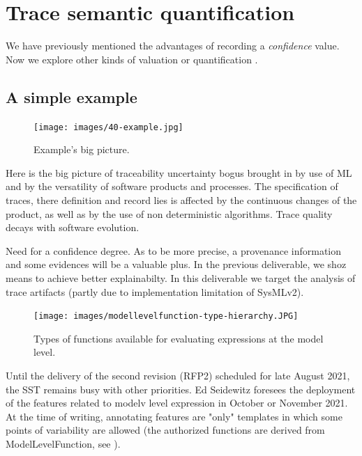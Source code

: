 \section{Trace semantic quantification}\label{sec:quantification}

We have previously mentioned the advantages of recording a \textit{confidence} value. Now we explore other kinds of valuation or quantification . 



\subsection{A simple example}\label{sec:example}
 
\begin{figure}[ht]     
	\centering
	\texttt{[image: images/40-example.jpg]}
	\caption{Example's big picture. }
	\label{fig:example}
\end{figure}


Here is the big picture of traceability uncertainty bogus brought in by use of ML and by the versatility of software products and processes. The specification of traces, there definition and record lies is affected by the continuous changes of the product, as well as by the use of non deterministic algorithms. Trace quality decays with software evolution.

Need for a confidence degree. As to be more precise, a provenance information and some evidences will be a valuable plus. In the previous deliverable, we shoz means to achieve better explainabilty. In this deliverable we target the analysis of trace artifacts (partly due to implementation limitation of SysMLv2).



\begin{figure}[ht]     
	\centering
	\texttt{[image: images/modellevelfunction-type-hierarchy.JPG]}
	\caption{Types of functions available for evaluating expressions at the model level.}
	\label{fig:modellevelfunc}
\end{figure}

Until the delivery of the second revision (RFP2) scheduled for late August 2021, the SST remains busy with other priorities. Ed Seidewitz foresees the deployment of the features related to modelv level expression in October or November 2021. At the time of writing, annotating features are "only" templates in which some points of variability are allowed (the authorized functions are derived from ModelLevelFunction, see ).

